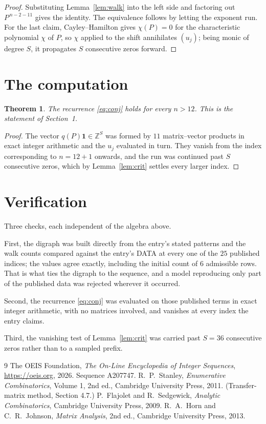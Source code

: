 \documentclass[11pt,a4paper]{article}
\theoremstyle{plain}
\newtheorem{theorem}{Theorem}
\theoremstyle{definition}
\begin{document}
\begin{proof}
Substituting Lemma~\ref{lem:walk} into the left side and factoring out
$P^{\,n-2-11}$ gives the identity. The equivalence follows by letting the exponent
run. For the last claim, Cayley--Hamilton gives $\chi(P)=0$ for the characteristic
polynomial $\chi$ of $P$, so $\chi$ applied to the shift annihilates $(u_j)$; being monic of
degree $S$, it propagates $S$ consecutive zeros forward.
\end{proof}

\section{The computation}

\begin{theorem}
The recurrence \eqref{eq:conj} holds for every $n>12$. This is the statement of
Section~1.
\end{theorem}

\begin{proof}
The vector $q(P)\mathbf{1}\in\mathbb{Z}^{S}$ was formed by $11$ matrix--vector
products in exact integer arithmetic and the $u_j$ evaluated in turn. They vanish from the
index corresponding to $n=12+1$ onwards, and the run was continued past $S$ consecutive
zeros, which by Lemma~\ref{lem:crit} settles every larger index.
\end{proof}

\section{Verification}

Three checks, each independent of the algebra above.

First, the digraph was built directly from the entry's stated patterns and the walk counts
compared against the entry's DATA at every one of the $25$ published indices; the
values agree exactly, including the initial count of $6$ admissible rows. That is
what ties the digraph to the sequence, and a model reproducing only part of the published
data was rejected wherever it occurred.

Second, the recurrence \eqref{eq:conj} was evaluated on those published terms in exact
integer arithmetic, with no matrices involved, and vanishes at every index the entry claims.

Third, the vanishing test of Lemma~\ref{lem:crit} was carried past $S=36$ consecutive
zeros rather than to a sampled prefix.

\begin{thebibliography}{9}
 The OEIS Foundation, \emph{The On-Line Encyclopedia of Integer
Sequences}, \url{https://oeis.org}, 2026. Sequence A207747.
 R.~P.~Stanley, \emph{Enumerative Combinatorics}, Volume 1, 2nd ed.,
Cambridge University Press, 2011. (Transfer-matrix method, Section 4.7.)
 P.~Flajolet and R.~Sedgewick, \emph{Analytic Combinatorics}, Cambridge
University Press, 2009.
 R.~A.~Horn and C.~R.~Johnson, \emph{Matrix Analysis}, 2nd ed., Cambridge
University Press, 2013.
\end{thebibliography}
\end{document}
